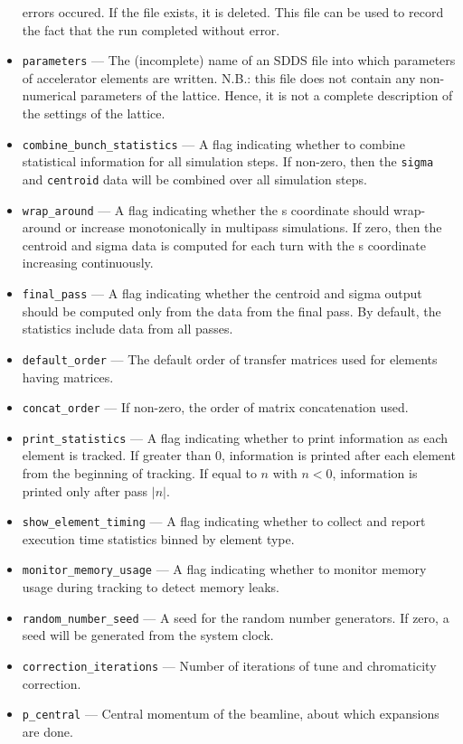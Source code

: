 \documentclass[11pt]{article}
\begin{document}
\begin{itemize}
errors occured.  If the file exists, it is deleted.  This file can be
used to record the fact that the run completed without error.
\item \verb|parameters| --- The (incomplete) name of an SDDS file into
which parameters of accelerator elements are written.
N.B.: this file does not contain any non-numerical parameters of the lattice.
Hence, it is not a complete description of the settings of the lattice.
\item \verb|combine_bunch_statistics| --- A flag indicating whether to
combine statistical information for all simulation steps.  If
non-zero, then the \verb|sigma| and \verb|centroid| data will be
combined over all simulation steps.
\item \verb|wrap_around| --- A flag indicating whether the s
 coordinate should wrap-around or increase monotonically in multipass
 simulations.  If zero, then the centroid and sigma data is computed for
 each turn with the s coordinate increasing continuously.
\item \verb|final_pass| --- A flag indicating whether the centroid and
 sigma output should be computed only from the data from the final pass.
 By default, the statistics include data from all passes.
\item \verb|default_order| --- The default order of transfer matrices
used for elements having matrices.
\item \verb|concat_order| --- If non-zero, the order of matrix
concatenation used.
\item \verb|print_statistics| --- A flag indicating whether to print
information as each element is tracked. If greater than 0, information is printed after each element from the beginning of tracking.
If equal to $n$ with $n<0$, information is printed only after pass $\left|n\right|$.
\item \verb|show_element_timing| --- A flag indicating whether to collect and report execution time statistics binned by element type.
\item \verb|monitor_memory_usage| --- A flag indicating whether to monitor memory usage during tracking to detect memory leaks.
\item \verb|random_number_seed| --- A seed for the random number generators.  If zero, a seed will be generated from the system clock.
\item \verb|correction_iterations| --- Number of iterations of tune and chromaticity correction.
\item \verb|p_central| --- Central momentum of the beamline, about which expansions are done.

\end{itemize}
\end{document}
